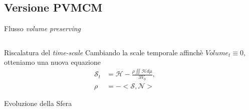 \subsection{Versione PVMCM}
\begin{frame}{Flusso \emph{volume preserving}}
  \begin{columns}[c]
    \begin{column}{6cm}
      \begin{block}{Riscalatura del \emph{time-scale}}
        Cambiando la scale temporale affinchè \alert{$Volume_t\equiv
          0$}, otteniamo una nuova equazione
        \[
        \begin{aligned}
          \mathcal{S}_t&=\mathcal{H}-\frac{\rho\iint\mathcal{H}d\mu}{3V_0},\\
          \rho &=-<\mathcal{S},\mathcal{N}>
        \end{aligned}
        \]
       \end{block}
      \begin{exampleblock}{Evoluzione della Sfera}
      
      \end{exampleblock}
    \end{column}
    \begin{column}[c]{4cm}
    \end{column}
    \end{columns}
\end{frame}
